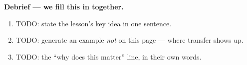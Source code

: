 \documentclass[10pt]{article}
\newcommand{\answerspace}[2]{\par\nopagebreak\noindent\begin{minipage}[t][#1][t]{\linewidth}%
  \color{keyred}\bfseries #2\end{minipage}\par}
\begin{document}
\vspace{0.10in}

\boxguard[18]
\begin{reflectionbox}
\small
\textbf{Debrief --- we fill this in together.}
\begin{enumerate}[leftmargin=1.9em, itemsep=6pt]
  \item TODO: state the lesson's key idea in one sentence.
        \answerspace{1.0cm}{}
  \item TODO: generate an example \emph{not} on this page --- where transfer shows up.
        \answerspace{1.2cm}{}
  \item TODO: the ``why does this matter'' line, in their own words.
        \answerspace{1.0cm}{}
\end{enumerate}
\end{reflectionbox}
\end{document}

